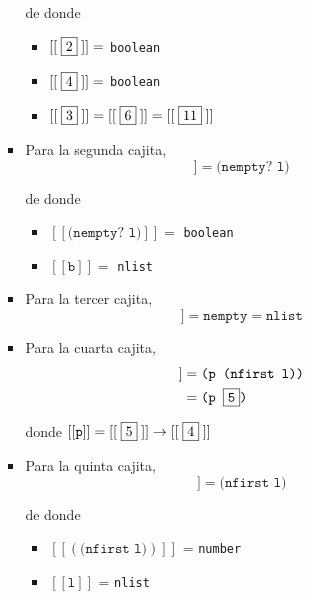 \documentclass[letterpaper,11pt]{article}
\begin{document}
\begin{enumerate}
\begin{enumerate}
\begin{itemize}
            de donde 
            \begin{itemize}
                \item $[[\;\fbox{2}\;]] =$ \texttt{boolean}
                \item $[[\;\fbox{4}\;]] =$ \texttt{boolean}
                \item $[[\;\fbox{3}\;]] = [[\;\fbox{6}\;]] = [[\;\fbox{11}\;]]$
            \end{itemize}

            \item Para la segunda cajita, 
            \begin{equation*}
                [[\;\fbox{2}\;]] = \texttt{(nempty? l)}
            \end{equation*}

            de donde 
            \begin{itemize}
                \item $[[\texttt{(nempty? l)}]] =$ \texttt{boolean}
                \item $[[\texttt{b}]] =$ \texttt{nlist}
            \end{itemize}

            \item Para la tercer cajita, 
            \begin{equation*}
                [[\;\fbox{3}\;]] = \texttt{nempty} = \texttt{nlist} 
            \end{equation*}
            \item Para la cuarta cajita,
            \begin{align*}
                [[\;\fbox{4}\;]] 
                &= \texttt{(p (nfirst l))} \\ 
                &= \texttt{(p \fbox{5})}
            \end{align*}

            donde $[[\texttt{p}]] = [[\;\fbox{5}\;]] \rightarrow 
            [[\;\fbox{4}\;]]$

            \item Para la quinta cajita,
            \begin{equation*}
                [[\;\fbox{5}\;]] 
                = \texttt{(nfirst l)}
            \end{equation*}

            de donde 
            \begin{itemize}
                \item $[[(\texttt{(nfirst l)})]]$ = \texttt{number}
                \item $[[\texttt{l}]]$ = \texttt{nlist}
            \end{itemize}


\end{itemize}
\end{enumerate}
\end{enumerate}
\end{document}
